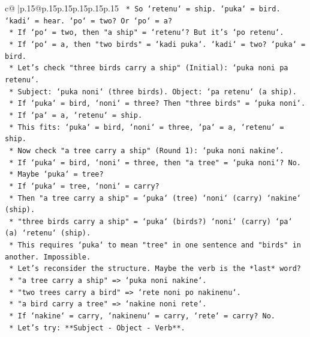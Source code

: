 \documentclass{article}
\begin{document}
{\begin{supertabular}{c@{$\;$}|p{.15\linewidth}@{}p{.15\linewidth}p{.15\linewidth}p{.15\linewidth}p{.15\linewidth}p{.15\linewidth}}
{{{\texttt{        *   So `retenu` = ship. `puka` = bird. `kadi` = hear. `po` = two? Or `po` = a?} \\
\texttt{        *   If `po` = two, then "a ship" = `retenu`? But it's `po retenu`.} \\
\texttt{        *   If `po` = a, then "two birds" = `kadi puka`. `kadi` = two? `puka` = bird.} \\
\texttt{        *   Let's check "three birds carry a ship" (Initial): `puka noni pa retenu`.} \\
\texttt{        *   Subject: `puka noni` (three birds). Object: `pa retenu` (a ship).} \\
\texttt{        *   If `puka` = bird, `noni` = three? Then "three birds" = `puka noni`.} \\
\texttt{        *   If `pa` = a, `retenu` = ship.} \\
\texttt{        *   This fits: `puka` = bird, `noni` = three, `pa` = a, `retenu` = ship.} \\
\texttt{        *   Now check "a tree carry a ship" (Round 1): `puka noni nakine`.} \\
\texttt{        *   If `puka` = bird, `noni` = three, then "a tree" = `puka noni`? No.} \\
\texttt{        *   Maybe `puka` = tree?} \\
\texttt{        *   If `puka` = tree, `noni` = carry?} \\
\texttt{        *   Then "a tree carry a ship" = `puka` (tree) `noni` (carry) `nakine` (ship).} \\
\texttt{        *   "three birds carry a ship" = `puka` (birds?) `noni` (carry) `pa` (a) `retenu` (ship).} \\
\texttt{        *   This requires `puka` to mean "tree" in one sentence and "birds" in another. Impossible.} \\
\texttt{    *   Let's reconsider the structure. Maybe the verb is the *last* word?} \\
\texttt{        *   "a tree carry a ship" => `puka noni nakine`.} \\
\texttt{        *   "two trees carry a bird" => `rete noni po nakinenu`.} \\
\texttt{        *   "a bird carry a tree" => `nakine noni rete`.} \\
\texttt{        *   If `nakine` = carry, `nakinenu` = carry, `rete` = carry? No.} \\
\texttt{    *   Let's try: **Subject {-} Object {-} Verb**.} \\
}}}
\end{supertabular}}
\end{document}
